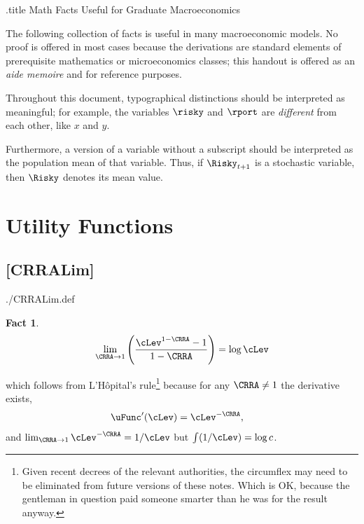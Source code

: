 \documentclass{handout}
\newtheorem{Fact}{Fact}
\begin{document}
\handoutHeader


\begin{verbatimwrite}{\jobname.title}
Math Facts Useful for Graduate Macroeconomics
\end{verbatimwrite}

\handoutNameMake 

The following collection of facts is useful in many macroeconomic
models.  No proof is offered in most cases because the derivations
are standard elements of prerequisite mathematics or microeconomics classes;
this handout is offered as an {\it aide memoire} and for reference purposes.

Throughout this document, typographical distinctions should be interpreted as 
meaningful; for example, the variables $\risky$ and $\rport$ are {\it different} from 
each other, like $x$ and $y$.

Furthermore, a version of a variable without a subscript should be interpreted as 
the population mean of that variable.  Thus, if $\Risky_{t+1}$ is a stochastic
variable, then $\Risky$ denotes its mean value.


\section{{Utility Functions}}


\hypertarget{CRRALim}{}
\subsection{{[CRRALim]}}\label{CRRALim} 

\begin{verbatimwrite}{./CRRALim.def}
\providecommand{\CRRALim}{\href{https://www.econ2.jhu.edu/people/ccarroll/public/LectureNotes/MathFacts/MathFactsList\#CRRALim}{\ensuremath{\mathtt{[CRRALim]}}}}
\end{verbatimwrite}

\begin{Fact} \label{fact:CRRALim} 
\begin{equation}
\lim_{\CRRA \rightarrow 1} \left(\frac{\cLev^{1-\CRRA}-1}{1-\CRRA}\right) = \log \cLev
\end{equation}
\end{Fact}
\noindent which follows from L'H\^{o}pital's rule\footnote{Given recent decrees of the relevant authorities, the circumflex may need to be eliminated from future versions of these notes.  Which is OK, because the gentleman in question paid someone smarter than he was for the result anyway.}  because for any $\CRRA \neq 1$ the derivative exists,
\begin{equation}\begin{gathered}\begin{aligned}
  \uFunc^{\prime}(\cLev) & =  \cLev^{-\CRRA},
\end{aligned}\end{gathered}\end{equation}
and $\lim_{\CRRA \rightarrow 1} \cLev^{-\CRRA} = 1/\cLev$ but $\int (1/\cLev) = \log c$.
\end{document}
